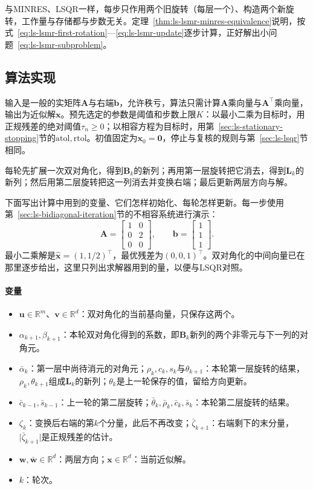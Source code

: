 与MINRES、LSQR一样，每步只作用两个旧旋转（每层一个）、构造两个新旋转，工作量与存储都与步数无关。定理~\ref{thm:ls-lsmr-minres-equivalence}说明，按式~\eqref{eq:ls-lsmr-first-rotation}—\eqref{eq:ls-lsmr-update}逐步计算，正好解出小问题~\eqref{eq:ls-lsmr-subproblem}。

\subsection{算法实现}

输入是一般的实矩阵$\bm A$与右端$\bm b$，允许秩亏，算法只需计算$\bm A$乘向量与$\bm A^\top$乘向量，输出为近似解$\bm x$。预先选定的参数是阈值和步数上限$K$：以最小二乘为目标时，用正规残差的绝对阈值$\tau_n\ge0$；以相容方程为目标时，用第~\ref{sec:ls-stationary-stopping}节的$\mathrm{atol},\mathrm{rtol}$。初值固定为$\bm x_0=\bm0$，停止与复核的规则与第~\ref{sec:ls-lsqr}节相同。

每轮先扩展一次双对角化，得到$\bm B_k$的新列；再用第一层旋转把它消去，得到$\bm L_k$的新列；然后用第二层旋转把这一列消去并变换右端；最后更新两层方向与解。

下面写出计算中用到的变量、它们怎样初始化、每轮怎样更新。每一步使用第~\ref{sec:ls-bidiagonal-iteration}节的不相容系统进行演示：
\[
 \bm A=\begin{bmatrix}1&0\\0&2\\0&0\end{bmatrix},\qquad
 \bm b=\begin{bmatrix}1\\1\\1\end{bmatrix}.
\]
最小二乘解是$\hat{\bm x}=(1,1/2)^\top$，最优残差为$(0,0,1)^\top$。双对角化的中间向量已在那里逐步给出，这里只列出求解器用到的量，以便与LSQR对照。

\paragraph{变量}
\begin{itemize}
 \item $\bm u\in\mathbb R^m$、$\bm v\in\mathbb R^d$：双对角化的当前基向量，只保存这两个。
 \item $\alpha_{k+1},\beta_{k+1}$：本轮双对角化得到的系数，即$\bm B_k$新列的两个非零元与下一列的对角元。
 \item $\bar\alpha_k$：第一层中尚待消元的对角元；$\rho_k,c_k,s_k$与$\theta_{k+1}$：本轮第一层旋转的结果，$\rho_k,\theta_{k+1}$组成$\bm L_k$的新列；$\theta_k$是上一轮保存的值，留给方向更新。
 \item $\bar c_{k-1},\bar s_{k-1}$：上一轮的第二层旋转；$\bar\theta_k,\bar\rho_k,\bar c_k,\bar s_k$：本轮第二层旋转的结果。
 \item $\zeta_k$：变换后右端的第$k$个分量，此后不再改变；$\bar\zeta_{k+1}$：右端剩下的末分量，$\lvert\bar\zeta_{k+1}\rvert$是正规残差的估计。
 \item $\bm w,\bar{\bm w}\in\mathbb R^d$：两层方向；$\bm x\in\mathbb R^d$：当前近似解。
 \item $k$：轮次。
\end{itemize}

